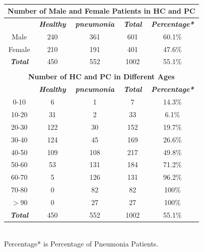 \documentclass[journal]{IEEEtran}
\begin{document}
\begin{table}[htb]
    \vspace{-0cm}
    \caption{}
    \vspace{-0cm}
    \begin{center}
    \begin{tabular}{c|c|c|c|c}
    \multicolumn{5}{c}{\textbf{Number of Male and Female Patients in HC and PC}} \\
    \hline
    \textbf{\textit{}} & \textbf{\textit{Healthy}} & \textbf{\textit{pneumonia}}& \textbf{\textit{Total}}& \textbf{\textit{Percentage*}} \\
    \hline
    Male & 240 & 361 & 601 & 60.1\%\\
    Female & 210 & 191 & 401 &47.6\% \\
    \hline
    \textbf{\textit{Total}} & 450 & 552 & 1002 & 55.1\% \\
    
    \hline
    \multicolumn{5}{c}{}\\
    \multicolumn{5}{c}{\textbf{Number of HC and PC in Different Ages}} \\

    \hline
    \textbf{\textit{}} & \textbf{\textit{Healthy}} & \textbf{\textit{pneumonia}}& \textbf{\textit{Total}}& \textbf{\textit{Percentage*}} \\
    \hline
    0-10 & 6 & 1 & 7 & 14.3\%\\
    10-20 & 31 & 2 & 33 & 6.1\%\\
    20-30 & 122 & 30 & 152 & 19.7\%\\
    30-40 & 124 & 45 & 169 &26.6\%\\
    40-50 & 109 & 108 & 217 &49.8\%\\
    50-60 & 53 & 131 & 184 &71.2\%\\
    60-70 & 5 & 126 & 131 &96.2\%\\
    70-80 & 0 & 82 & 82 &100\%\\
    $>90$& 0 & 27 & 27 &100\%\\
    \hline 
    \textbf{\textit{Total}} & 450 & 552 & 1002 & 55.1\% \\

    \hline
    \end{tabular}
    \vspace{0.1cm}
 \\
    \footnotesize{Percentage* is Percentage of Pneumonia Patients. }

    \end{center}
    \label{malefemale}

    \vspace{-0.0cm}
    \end{table}
\end{document}
